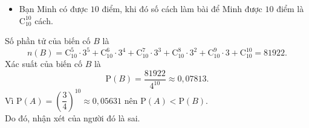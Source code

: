 \begin{ex}
{\begin{enumerate}
\begin{itemize}
				\item Bạn Minh có được $10$ điểm, khi đó số cách làm bài để Minh được $10$ điểm là $\mathrm{C}^{10}_{10}$ cách.
			\end{itemize}
			Số phần tử của biến cố $B$ là
			$$ n(B) = \mathrm{C}^5_{10}\cdot 3^5 + \mathrm{C}^6_{10}\cdot 3^4 + \mathrm{C}^7_{10}\cdot 3^3 + \mathrm{C}^8_{10}\cdot 3^2 + \mathrm{C}^9_{10}\cdot 3 + \mathrm{C}^{10}_{10} = 81922. $$
			Xác suất của biến cố $B$ là
			$$ \mathrm{P}(B) = \dfrac{81922}{4^{10}} \approx 0{,}07813. $$
			Vì $\mathrm{P}(A) = \left(\dfrac{3}{4}\right)^{10} \approx 0{,}05631$ nên $\mathrm{P}(A) < \mathrm{P}(B)$.\\
			Do đó, nhận xét của người đó là sai.
		\end{enumerate}
	}
\end{ex}